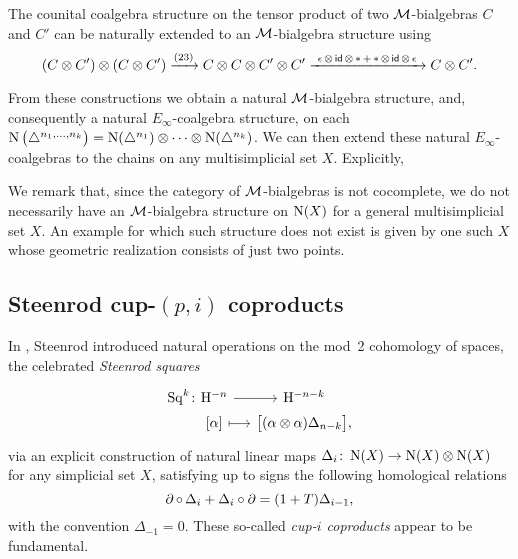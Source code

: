 %	

The counital coalgebra structure on the tensor product of two $\mathcal{M}$-bialgebras $C$ and $C'$ can be naturally extended to an $\mathcal{M}$-bialgebra structure using
\[
(C \otimes C^\prime) \otimes (C \otimes C^\prime) \xrightarrow{(23)}
C \otimes C \otimes C^\prime \otimes C^\prime
\xrightarrow{\ \operatorname{\epsilon} \otimes \, \mathsf{id} \, \otimes \, \operatorname{\ast} + \operatorname{\ast} \otimes \, \mathsf{id} \, \otimes \,\operatorname{\epsilon}\ }
C \otimes C^\prime.
\]

From these constructions we obtain a natural $\mathcal{M}$-bialgebra structure, and, consequently a natural $E_\infty$-coalgebra structure, on each $\operatorname{N} \big( \triangle^{n_1, \dots, n_k} \big) = \operatorname{N}(\triangle^{n_1}) \otimes \dotsb \otimes \operatorname{N}(\triangle^{n_k})$.
We can then extend these natural $E_\infty$-coalgebras to the chains on any multisimplicial set $X$.
Explicitly, 

We remark that, since the category of $\mathcal{M}$-bialgebras is not cocomplete, we do not necessarily have an $\mathcal{M}$-bialgebra structure on $\operatorname{N}(X)$ for a general multisimplicial set $X$.
An example for which such structure does not exist is given by one such $X$ whose geometric realization consists of just two points.

\subsection{Steenrod cup-$(p,i)$ coproducts} \label{ss:cup coproducts}

In \cite{steenrod1947products}, Steenrod introduced natural operations on the mod~2 cohomology of spaces, the celebrated \textit{Steenrod squares}
\[
\begin{tikzcd} [column sep=small, row sep=0]
	\Sq^k \colon &[-20] \rH^{-n} \arrow[r] & \rH^{-n-k} \\ &
	{[\alpha]} \arrow[r, mapsto] & \big[ (\alpha \ot \alpha) \Delta_{n-k} \big],
\end{tikzcd}
\]
via an explicit construction of natural linear maps $\Delta_i \colon \operatorname{N}(X) \to \operatorname{N}(X) \otimes \operatorname{N}(X)$ for any simplicial set $X$, satisfying up to signs the following homological relations
\begin{equation} \label{e:cupi homological relations}
	\operatorname{\partial} \circ \, \Delta_i + \Delta_i \circ \operatorname{\partial} =
	(1 + T) \Delta_{i-1},
\end{equation}
with the convention $\Delta_{-1} = 0$.
These so-called \textit{cup-$i$ coproducts} appear to be fundamental.

